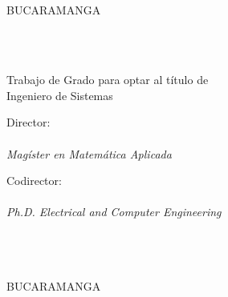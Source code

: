 
\thispagestyle{empty}

\begin{center}

\MakeUppercase{\titulo} \vspace{7cm}

\MakeUppercase{\autor}\\
\vspace{7cm}

\MakeUppercase{\universidad}\\
\MakeUppercase{\facultad}\\
\MakeUppercase{\escuela}\\
BUCARAMANGA\\
\fecha\\

\end{center}


\newpage
\thispagestyle{empty}

\begin{center}

\MakeUppercase{\titulo} \vspace{2.3cm}

\MakeUppercase{\autor}\\
\vspace{2.3cm}

Trabajo de Grado para optar al título de\\
Ingeniero de Sistemas\\\vspace{1.5cm}

Director:\\
\director\\
\textit{Magíster en Matemática Aplicada}\vspace{0.5cm}

Codirector:\\
\codirector\\
\textit{Ph.D. Electrical and Computer Engineering} \vspace{1.5cm}

\MakeUppercase{\universidad}\\
\MakeUppercase{\facultad}\\
\MakeUppercase{\escuela}\\
BUCARAMANGA\\
\fecha\\

\end{center}

